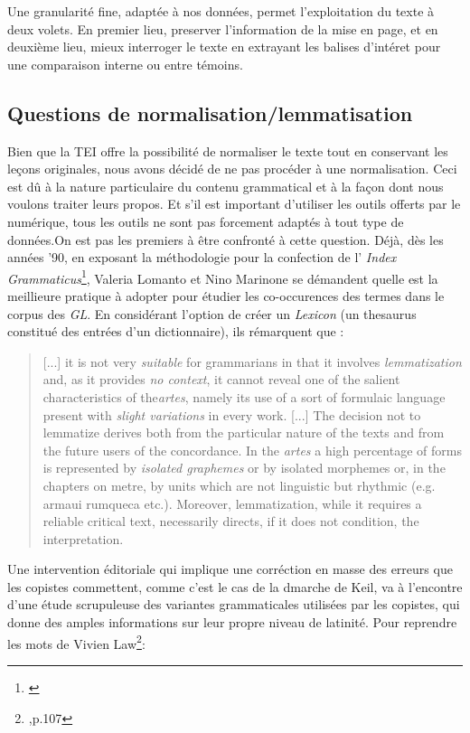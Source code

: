 \documentclass[a4paper, twoside, 12pt]{book}
\begin{document}
Une granularité fine, adaptée à nos données, permet  l'exploitation du texte à deux volets. En premier lieu, preserver l'information de la mise en page, et en deuxième lieu, mieux interroger le texte en extrayant les balises d'intéret pour une comparaison interne ou entre témoins.

\subsection{Questions de normalisation/lemmatisation}

Bien que la TEI offre la possibilité de normaliser le texte tout en conservant les leçons originales, nous avons décidé de ne pas procéder à une normalisation. Ceci est dû à la nature particulaire du contenu grammatical et à la façon dont nous voulons traiter leurs propos. Et s'il est important d'utiliser les outils offerts par le numérique, tous les outils ne sont pas forcement adaptés à tout type de données.On est pas les premiers à être confronté à cette question. Déjà, dès les années '90, en exposant la méthodologie pour la confection de l' \textit{Index Grammaticus}\footnote{\cite{lomanto1990concordance}}, Valeria Lomanto et Nino Marinone se démandent quelle est la meillieure pratique à adopter pour étudier les co-occurences des termes dans le corpus des \textit{GL}. En considérant l'option de créer un \textit{Lexicon} (un thesaurus constitué des entrées d'un dictionnaire), ils rémarquent que : \blockquote{[...] it is not very \textit{suitable} for grammarians in that it involves \textit{lemmatization} and, as it provides \textit{no context}, it cannot reveal one of the salient characteristics of the\textit{artes}, namely its use of a sort of formulaic language present with \textit{slight variations} in every work. [...] The decision not to lemmatize derives both from the particular nature of the texts and from the future users of the concordance. In the \textit{artes} a high percentage of forms is represented by \textit{isolated graphemes} or by isolated morphemes or, in the chapters on metre, by units which are not linguistic but rhythmic (e.g. armaui rumqueca etc.). Moreover, lemmatization, while it requires a reliable critical text, necessarily
directs, if it does not condition, the interpretation.}

Une intervention éditoriale qui implique une corréction en masse des \og{} erreurs \fg{} que les copistes commettent, comme c'est le cas de la dmarche de Keil, va à l'encontre d'une étude scrupuleuse des variantes grammaticales utilisées par les copistes, qui donne des amples informations sur leur propre niveau de latinité. Pour reprendre les mots de Vivien Law\footnote{\cite{law1982insular},p.107}: 
\end{document}
